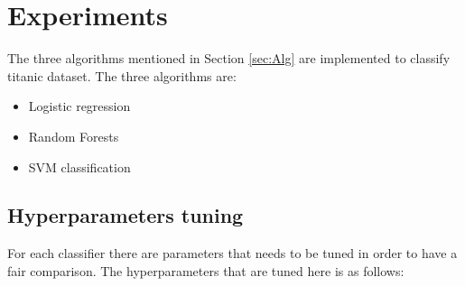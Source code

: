 %
%

\section{Experiments}

The three algorithms mentioned in Section \ref{sec:Alg} are implemented to classify titanic dataset. The three algorithms are:
\begin{itemize}
	\item Logistic regression
	\item Random Forests
	\item SVM classification
\end{itemize}

\subsection{Hyperparameters tuning}
For each classifier there are parameters that needs to be tuned in order to have a fair comparison. The hyperparameters that are tuned here is as follows:
 
